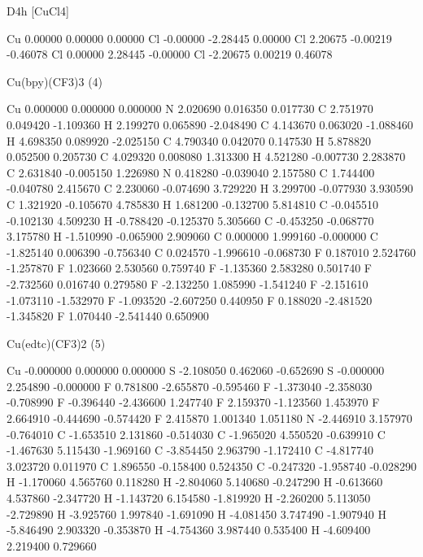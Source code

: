 D4h [CuCl4]

Cu 0.00000 0.00000 0.00000
Cl -0.00000 -2.28445 0.00000
Cl 2.20675 -0.00219 -0.46078
Cl 0.00000 2.28445 -0.00000
Cl -2.20675 0.00219 0.46078




Cu(bpy)(CF3)3 (4)

Cu 0.000000 0.000000 0.000000
 N 2.020690 0.016350 0.017730
 C 2.751970 0.049420 -1.109360
 H 2.199270 0.065890 -2.048490
 C 4.143670 0.063020 -1.088460
 H 4.698350 0.089920 -2.025150
 C 4.790340 0.042070 0.147530
 H 5.878820 0.052500 0.205730
 C 4.029320 0.008080 1.313300
 H 4.521280 -0.007730 2.283870
 C 2.631840 -0.005150 1.226980
 N 0.418280 -0.039040 2.157580
 C 1.744400 -0.040780 2.415670
 C 2.230060 -0.074690 3.729220
 H 3.299700 -0.077930 3.930590
 C 1.321920 -0.105670 4.785830
 H 1.681200 -0.132700 5.814810
 C -0.045510 -0.102130 4.509230
 H -0.788420 -0.125370 5.305660
 C -0.453250 -0.068770 3.175780
 H -1.510990 -0.065900 2.909060
 C 0.000000 1.999160 -0.000000
 C -1.825140 0.006390 -0.756340
 C 0.024570 -1.996610 -0.068730
 F 0.187010 2.524760 -1.257870
 F 1.023660 2.530560 0.759740
 F -1.135360 2.583280 0.501740
 F -2.732560 0.016740 0.279580
 F -2.132250 1.085990 -1.541240
 F -2.151610 -1.073110 -1.532970
 F -1.093520 -2.607250 0.440950
 F 0.188020 -2.481520 -1.345820
 F 1.070440 -2.541440 0.650900


Cu(edtc)(CF3)2 (5)

Cu -0.000000 0.000000 0.000000
 S -2.108050 0.462060 -0.652690
 S -0.000000 2.254890 -0.000000
 F 0.781800 -2.655870 -0.595460
 F -1.373040 -2.358030 -0.708990
 F -0.396440 -2.436600 1.247740
 F 2.159370 -1.123560 1.453970
 F 2.664910 -0.444690 -0.574420
 F 2.415870 1.001340 1.051180
 N -2.446910 3.157970 -0.764010
 C -1.653510 2.131860 -0.514030
 C -1.965020 4.550520 -0.639910
 C -1.467630 5.115430 -1.969160
 C -3.854450 2.963790 -1.172410
 C -4.817740 3.023720 0.011970
 C 1.896550 -0.158400 0.524350
 C -0.247320 -1.958740 -0.028290
 H -1.170060 4.565760 0.118280
 H -2.804060 5.140680 -0.247290
 H -0.613660 4.537860 -2.347720
 H -1.143720 6.154580 -1.819920
 H -2.260200 5.113050 -2.729890
 H -3.925760 1.997840 -1.691090
 H -4.081450 3.747490 -1.907940
 H -5.846490 2.903320 -0.353870
 H -4.754360 3.987440 0.535400
 H -4.609400 2.219400 0.729660